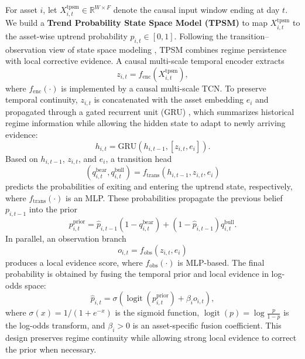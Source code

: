 \documentclass[letterpaper]{article} %
\begin{document}
For asset \(i\), let \(X^{\mathrm{tpsm}}_{i,t}\in\mathbb{R}^{W\times F}\) denote the causal input window ending at day \(t\). We build a \textbf{Trend Probability State Space Model (TPSM)} to map \(X^{\mathrm{tpsm}}_{i,t}\) to the asset-wise uptrend probability \(p_{i,t}\in[0,1]\). Following the transition--observation view of state space modeling \citep{Durbin2001TimeSA,Rangapuram2018DeepSS}, TPSM combines regime persistence with local corrective evidence. A causal multi-scale temporal encoder extracts
\[
z_{i,t}=f_{\mathrm{enc}}\!\left(X^{\mathrm{tpsm}}_{i,t}\right),
\]
where \(f_{\mathrm{enc}}(\cdot)\) is implemented by a causal multi-scale TCN. To preserve temporal continuity, \(z_{i,t}\) is concatenated with the asset embedding \(e_i\) and propagated through a gated recurrent unit (GRU) \citep{Chung2014EmpiricalEO}, which summarizes historical regime information while allowing the hidden state to adapt to newly arriving evidence:
\[
h_{i,t}=\mathrm{GRU}\!\left(h_{i,t-1},[z_{i,t},e_i]\right).
\]
Based on \(h_{i,t-1}\), \(z_{i,t}\), and \(e_i\), a transition head
\[
(q^{\mathrm{bear}}_{i,t},q^{\mathrm{bull}}_{i,t})
=
f_{\mathrm{trans}}\!\left(h_{i,t-1},z_{i,t},e_i\right)
\]
predicts the probabilities of exiting and entering the uptrend state, respectively, where \(f_{\mathrm{trans}}(\cdot)\) is an MLP. These probabilities propagate the previous belief \(p_{i,t-1}\) into the prior
\[
p^{\mathrm{prior}}_{i,t}
=
\hat{p}_{i,t-1}(1-q^{\mathrm{bear}}_{i,t})
+
(1-\hat{p}_{i,t-1})q^{\mathrm{bull}}_{i,t}.
\]
In parallel, an observation branch
\[
o_{i,t}=f_{\mathrm{obs}}(z_{i,t},e_i)
\]
produces a local evidence score, where \(f_{\mathrm{obs}}(\cdot)\) is MLP-based. The final probability is obtained by fusing the temporal prior and local evidence in log-odds space:
\[
\hat{p}_{i,t}
=
\sigma\!\left(
\operatorname{logit}\!\left(p^{\mathrm{prior}}_{i,t}\right)
+
\beta_i o_{i,t}
\right),
\]
where \(\sigma(x)=1/(1+e^{-x})\) is the sigmoid function, \(\operatorname{logit}(p)=\log \frac{p}{1-p}\) is the log-odds transform, and \(\beta_i>0\) is an asset-specific fusion coefficient. This design preserves regime continuity while allowing strong local evidence to correct the prior when necessary.
\end{document}
